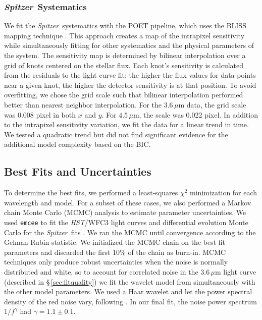 \documentclass[twocolumn]{aastex61}
\newcommand{\project}[1]{\textsl{#1}}
\newcommand{\HST}{\project{HST}}
\newcommand{\Spitzer}{\project{Spitzer}}
\begin{document}
\subsubsection{\Spitzer\ Systematics}
We fit the \Spitzer\ systematics with the POET pipeline, which uses the BLISS mapping technique \citep{stevenson12}. This approach creates a map of the intrapixel sensitivity while simultaneously fitting for other systematics and the physical parameters of the system. The sensitivity map is determined by bilinear interpolation over a grid of knots centered on the stellar flux. Each knot's sensitivity is calculated from the residuals to the light curve fit: the higher the flux values for data points near a given knot, the higher the detector sensitivity is at that position.  To avoid overfitting, we chose the grid scale such that bilinear interpolation performed better than nearest neighbor interpolation. For the $3.6\,\mu$m data, the grid scale was 0.008 pixel in both $x$ and $y$. For $4.5\,\mu$m, the scale was 0.022 pixel.  In addition to the intrapixel sensitivity variation, we fit the data for a linear trend in time. We tested a quadratic trend but did not find significant evidence for the additional model complexity based on the BIC. 


\subsection{Best Fits and Uncertainties}
To determine the best fits, we performed a least-squares $\chi^2$ minimization for each wavelength and model. For a subset of these cases, we also performed a Markov chain Monte Carlo (MCMC) analysis to estimate parameter uncertainties. We used \texttt{emcee} \citep{foremanmackey13} to fit the \HST/WFC3 light curves and differential evolution Monte Carlo for the \Spitzer\ fits \citep{braak06}. We ran the MCMC until convergence according to the Gelman-Rubin statistic. We initialized the MCMC chain on the best fit parameters and discarded the first 10\% of the chain as burn-in. MCMC techniques only produce robust uncertainties when the noise is normally distributed and white, so to account for correlated noise in the $3.6\,\mu$m light curve (described in \S\,\ref{sec:fitquality}) we fit the wavelet model from \cite{carter09} simultaneously with the other model parameters. We used a Haar wavelet and let the power spectral density of the red noise vary, following \cite{diamond-lowe14}. In our final fit, the noise power spectrum $1/f^\gamma$ had $\gamma = 1.1 \pm 0.1$.  
\end{document}
